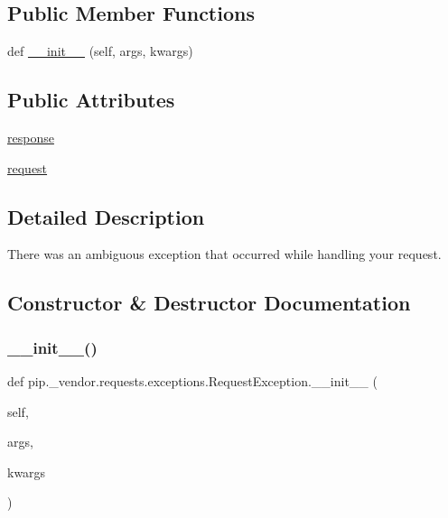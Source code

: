 \subsection*{Public Member Functions}
\begin{DoxyCompactItemize}
\item 
def \hyperlink{classpip_1_1__vendor_1_1requests_1_1exceptions_1_1RequestException_ac5842677d287410dbfc25c6fa1295cda}{\+\_\+\+\_\+init\+\_\+\+\_\+} (self, args, kwargs)
\end{DoxyCompactItemize}
\subsection*{Public Attributes}
\begin{DoxyCompactItemize}
\item 
\hyperlink{classpip_1_1__vendor_1_1requests_1_1exceptions_1_1RequestException_a0e345d98e65e24f94ef4336d2c6384d2}{response}
\item 
\hyperlink{classpip_1_1__vendor_1_1requests_1_1exceptions_1_1RequestException_a68a0b2dcf4804bbd26c9b61ae90e34a2}{request}
\end{DoxyCompactItemize}


\subsection{Detailed Description}
\begin{DoxyVerb}There was an ambiguous exception that occurred while handling your
request.
\end{DoxyVerb}
 

\subsection{Constructor \& Destructor Documentation}
\mbox{\label{classpip_1_1__vendor_1_1requests_1_1exceptions_1_1RequestException_ac5842677d287410dbfc25c6fa1295cda}} 
\subsubsection{\texorpdfstring{\+\_\+\+\_\+init\+\_\+\+\_\+()}{\_\_init\_\_()}}
{\footnotesize\ttfamily def pip.\+\_\+vendor.\+requests.\+exceptions.\+Request\+Exception.\+\_\+\+\_\+init\+\_\+\+\_\+ (\begin{DoxyParamCaption}\item[{}]{self,  }\item[{}]{args,  }\item[{}]{kwargs }\end{DoxyParamCaption})}

